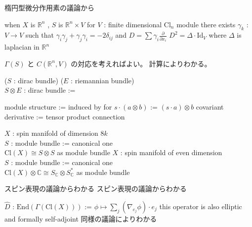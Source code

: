\begin{Proof}
\itemprof
  楕円型微分作用素の議論から
\end{Proof}

\begin{Theorem}
\itemwhen
  when \(X\) is \(\mathbb{R}^n\) , \(S\) is \(\mathbb{R}^n \times V\) for \(V\) : finite dimensional \(\text{Cl}_n\) module
\itemprop
  there exists \(\gamma_k\) : \(V \to V\) such that \(\gamma_i \gamma_j + \gamma_j \gamma_i = -2 \delta_{ij}\) and \(D = \sum \gamma_i \frac{\partial}{\partial x_i}\)
\itemprop
  \(D^2 = \Delta \cdot \text{Id}_V\)
  where \(\Delta\) is laplacian in \(\mathbb{R}^n\)
\end{Theorem}

\begin{Proof}
\itemprof
  \(\Gamma(S)\) と \(C(\mathbb{R}^n , V)\) の対応を考えればよい。
\itemprof
  計算によりわかる。
\end{Proof}

\begin{Definition}
\itemdefi
  \For (\(S\) : dirac bundle) (\(E\) : riemannian bundle) \\
  \Define \(S \otimes E\) : dirac bundle :=
  \begin{itemize}
    \itemenum module structure := induced by for \(s \cdot (a \otimes b)\) := \((s \cdot a) \otimes b\)
    \itemenum covariant derivative := tensor product connection
  \end{itemize}
\end{Definition}

\begin{Theorem}
\itemprop
  \Fix \(X\) : spin manifold of dimension \(8k\) \\
  \Let \(S\) : module bundle := canonical one \\
  \Then \(\text{Cl}(X) \cong S \otimes S\) as module bundle
\itemprop
  \Fix \(X\) : spin manifold of even dimension \\
  \Let \(S\) : module bundle := canonical one \\
  \Then \(\text{Cl}(X) \otimes \mathbb{C} \cong S_{\mathbb{C}} \otimes S^*_{\mathbb{C}}\) as module bundle
\end{Theorem}

\begin{Proof}
\itemprof
  スピン表現の議論からわかる
\itemprof
  スピン表現の議論からわかる
\end{Proof}

\begin{Definition}
\itemdefi
  \Define \(\hat{D}\) : \(\text{End}(\Gamma(\text{Cl}(X)))\) := \(\phi \mapsto \sum_j (\nabla_{e_j} \phi) \cdot e_j\)
\itemprop
  this operator is also elliptic and formally self-adjoint
\itemprof
  同様の議論によりわかる
\end{Definition}

